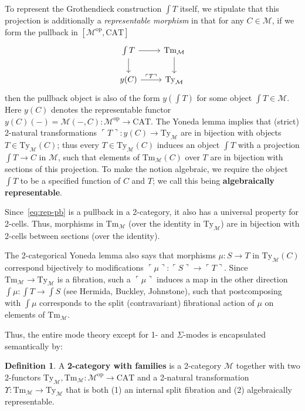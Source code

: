 \documentclass[10pt]{article}
\theoremstyle{definition}
\newtheorem{definition}{Definition}
\newcommand\op{^{\mathrm{op}}}
\newcommand\CAT{\mathrm{CAT}}
\newcommand\M{\mathcal{M}}
\newcommand\Mty{{\mathrm{Ty}_{\M}}}
\newcommand\Mtm{{\mathrm{Tm}_{\M}}}
\newcommand\Ups{\Upsilon}
\newcommand\name[1]{\ulcorner #1\urcorner}
\begin{document}
\begin{enumerate}
  To represent the Grothendieck construction $\int T$ itself, we stipulate that this projection is additionally a \emph{representable morphism} in that for any $C\in \M$, if we form the pullback in $[\M\op,\CAT]$
  \begin{equation}
    \begin{tikzcd}
      \int T \ar[d] \ar[r] & \Mtm \ar[d] \\
      y(C) \ar[r,"\name{T}"] & \Mty
    \end{tikzcd}\label{eq:rep-pb}
  \end{equation}
  then the pullback object is also of the form $y(\int T)$ for some object $\int T\in \M$.
  Here $y(C)$ denotes the representable functor $y(C)(-) = \M(-,C) : \M\op\to\CAT$.
  The Yoneda lemma implies that (strict) 2-natural transformations $\name{T} : y(C) \to \Mty$ are in bijection with objects $T\in \Mty(C)$; thus every $T\in \Mty(C)$ induces an object $\int T$ with a projection $\int T \to C$ in $\M$, such that elements of $\Mtm(C)$ over $T$ are in bijection with sections of this projection.
  To make the notion algebraic, we require the object $\int T$ to be a specified function of $C$ and $T$; we call this being \textbf{algebraically representable}.

  Since~\eqref{eq:rep-pb} is a pullback in a 2-category, it also has a universal property for 2-cells.
  Thus, morphisms in $\Mtm$ (over the identity in $\Mty$) are in bijection with 2-cells between sections (over the identity).

  The 2-categorical Yoneda lemma also says that morphisms $\mu : S\to T$ in $\Mty(C)$ correspond bijectively to modifications $\name{\mu}:\name{S} \to \name{T}$.
  Since $\Mtm\to\Mty$ is a fibration, such a $\name{\mu}$ induces a map in the other direction $\int \mu : \int T\to \int S$ (see Hermida, Buckley, Johnstone), such that postcomposing with $\int \mu$ corresponds to the split (contravariant) fibrational action of $\mu$ on elements of $\Mtm$.
\end{enumerate}

Thus, the entire mode theory except for 1- and $\Sigma$-modes is encapsulated semantically by:

\begin{definition}
  A \textbf{2-category with families} is a 2-category $\M$ together with two 2-functors $\Mty,\Mtm : \M\op\to\CAT$ and a 2-natural transformation $\Ups:\Mtm\to \Mty$ that is both (1) an internal split fibration and (2) algebraically representable.
\end{definition}
\end{document}

